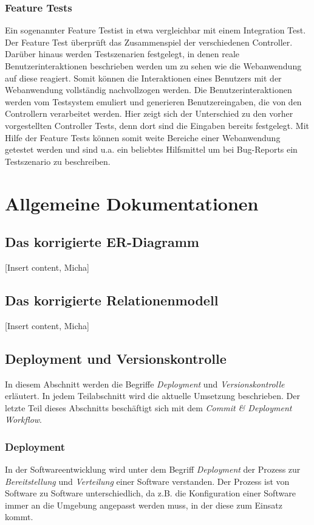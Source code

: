 \documentclass[12pt,             %
               a4paper,          %
               listof=totoc,     %
               index=totoc,      %
               bibliography=totoc,%
               oneside,         %
               BCOR1cm,          %
               english   %
               ]{scrbook}
\begin{document}
\subsection{Feature Tests}
Ein sogenannter \glqq Feature Test\grqq ist in etwa vergleichbar mit einem \glqq Integration Test\grqq. Der Feature Test überprüft das Zusammenspiel der verschiedenen Controller. Darüber hinaus werden Testszenarien festgelegt, in denen reale Benutzerinteraktionen beschrieben werden um zu sehen wie die Webanwendung auf diese reagiert. Somit können die Interaktionen eines Benutzers mit der Webanwendung vollständig nachvollzogen werden. Die Benutzerinteraktionen werden vom Testsystem emuliert und generieren Benutzereingaben, die von den Controllern verarbeitet werden. Hier zeigt sich der Unterschied zu den vorher vorgestellten Controller Tests, denn dort sind die Eingaben bereits festgelegt. Mit Hilfe der Feature Tests können somit weite Bereiche einer Webanwendung getestet werden und sind u.a. ein beliebtes Hilfsmittel um bei Bug-Reports ein Testszenario zu beschreiben.

\clearpage
\chapter{Allgemeine Dokumentationen}
\section{Das korrigierte ER-Diagramm}
[Insert content, Micha]

\section{Das korrigierte Relationenmodell}
[Insert content, Micha]

\section{Deployment und Versionskontrolle}
In diesem Abschnitt werden die Begriffe \textit{Deployment} und \textit{Versionskontrolle} erläutert. In jedem Teilabschnitt wird die aktuelle Umsetzung beschrieben. Der letzte Teil dieses Abschnitts beschäftigt sich mit dem \textit{Commit \& Deployment Workflow}.

\subsection{Deployment}\label{sec:deployment}
In der Softwareentwicklung wird unter dem Begriff \textit{Deployment} der Prozess zur \textit{Bereitstellung} und \textit{Verteilung} einer Software verstanden. Der Prozess ist von Software zu Software unterschiedlich, da z.B. die Konfiguration einer Software immer an die Umgebung angepasst werden muss, in der diese zum Einsatz kommt.\\
\end{document}
